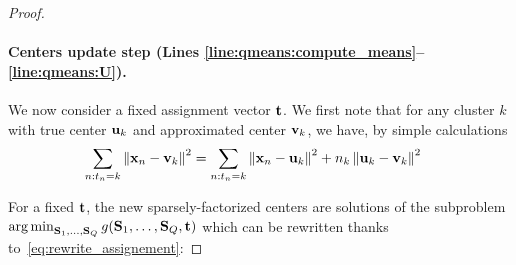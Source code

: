 \begin{proof}
\paragraph{Centers update step (Lines \ref{line:qmeans:compute_means}--\ref{line:qmeans:U}).} We now consider a fixed assignment vector ${\mathbf{t}}$. We first note that for any cluster $k$ with true center ${\mathbf{u}}_k$ and approximated center ${\mathbf{v}}_k$, we have, by simple calculations
\begin{align}
    \label{eq:rewrite_assignement}
	\sum_{n:t_n = k} \left \| {\mathbf{x}}_n -{\mathbf{v}}_k\right \|^2
	&= \sum_{n:t_n = k} \left \| {\mathbf{x}}_n-{\mathbf{u}}_k\right \|^2 + n_k \left \| {\mathbf{u}}_k-{\mathbf{v}}_k\right \|^2
\end{align}



For a fixed ${\mathbf{t}}$, the new sparsely-factorized centers are solutions of the subproblem $\operatorname*{arg\,min}_{{\mathbf{S}}_1, \ldots,{\mathbf{S}}_Q} g({\mathbf{S}}_1, \ldots,{\mathbf{S}}_Q, {\mathbf{t}})$ which can be rewritten thanks to~\eqref{eq:rewrite_assignement}:
%




\end{proof}
